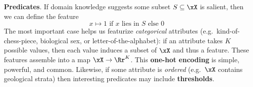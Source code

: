   \textbf{Predicates}.
      If domain knowledge suggests some subset
      $S \subseteq \xX$ is salient, then we can define the feature
      $$
        x \mapsto \text{$1$ if $x$ lies in $S$ else $0$}
      $$
      The most important case helps us featurize \emph{categorical} attributes
      (e.g.\ kind-of-chess-piece, biological sex, or letter-of-the-alphabet):
      if an attribute takes $K$ possible values, then each value induces a
      subset of $\xX$ and thus a feature.  These features assemble into a map
      $\xX\to\Rr^K$.  This \textbf{one-hot encoding} is simple, powerful, and
      common.
      Likewise, if some attribute is \emph{ordered} (e.g.\ $\xX$
      contains
      geological strata)
      then interesting predicates may include \textbf{thresholds}.


